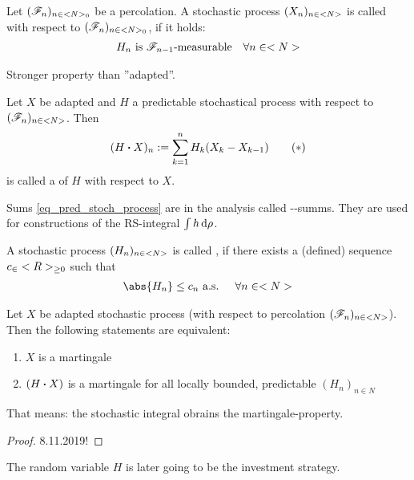 \begin{*definition}[predictable]
	Let $(\mathscr F_n)_{n\in <N>_0}$ be a percolation. A stochastic process $(X_n)_{n \in <N>}$ is called  with respect to $(\mathscr F_n)_{n \in <N>_0}$, if it holds:
	\begin{align*}
		H_n \text{ is } \mathscr F_{n-1}\text{-measurable} \quad \forall n \in <N>
	\end{align*}
\end{*definition}
\begin{*remark}
	Stronger property than ''adapted''.
\end{*remark}
\begin{*definition}
	Let $X$ be adapted and $H$ a predictable stochastical process with respect to $(\mathscr F_n)_{n \in <N>}$. Then
	\begin{align*}
		(H \boldsymbol{\cdot} X)_n := \sum_{k=1}^n H_k (X_k - X_{k-1}) \tag{$\ast$}\label{eq_pred_stoch_process}
	\end{align*}
	is called a  of $H$ with respect to $X$.
\end{*definition}
\begin{*remark}
	Sums \eqref{eq_pred_stoch_process} are in the analysis called --summs. They are used for constructions of the RS-integral $\int h \,\mathrm{d} \rho$.
\end{*remark}
\begin{*definition}
	A stochastic process $(H_n)_{n \in <N>}$ is called , if there exists a (defined) sequence $c_ \in <R>_{\ge 0}$  
	such that
	\begin{align*}
		\abs{H_n} \le c_n \text{ a.s. } \quad \forall n \in \N
	\end{align*}
\end{*definition}
\begin{theorem}
	Let $X$ be adapted stochastic process (with respect to percolation $(\mathscr F_n)_{n \in <N>}$). Then the following statements are equivalent:
	\begin{enumerate}
		\item $X$ is a martingale
		\item $(H \boldsymbol{\cdot} X)$ is a martingale for all locally bounded, predictable $(H_n)_{n \in N}$
	\end{enumerate}
	That means: the stochastic integral obrains the martingale-property.
\end{theorem}
\begin{proof}
	8.11.2019!
\end{proof}
\begin{*remark}
	The random variable $H$ is later going to be the investment strategy. 
\end{*remark}